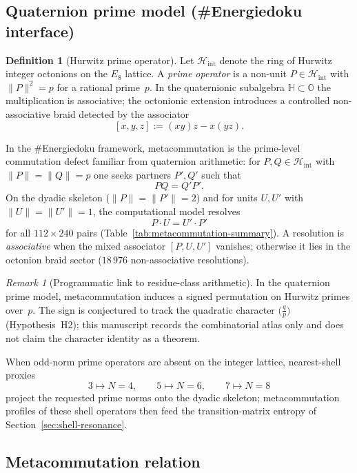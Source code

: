 \documentclass[11pt, lettersize, article]{article}
\theoremstyle{definition}
\newtheorem{definition}[theorem]{Definition}
\theoremstyle{remark}
\newtheorem{remark}[theorem]{Remark}
\begin{document}
\subsection{Quaternion prime model (\#Energiedoku interface)}

\begin{definition}[Hurwitz prime operator]
Let $\mathcal H_{\mathrm{int}}$ denote the ring of Hurwitz integer octonions on the $E_8$ lattice.
A \emph{prime operator} is a non-unit $P\in\mathcal H_{\mathrm{int}}$ with $\|P\|^2=p$ for a rational prime~$p$.
In the quaternionic subalgebra $\mathbb H\subset\mathbb O$ the multiplication is associative; the octonionic extension introduces a controlled non-associative braid detected by the associator
\[
  [x,y,z]:=(xy)z-x(yz).
\]
\end{definition}

In the \#Energiedoku framework, metacommutation is the prime-level commutation defect familiar from quaternion arithmetic:
for $P,Q\in\mathcal H_{\mathrm{int}}$ with $\|P\|=\|Q\|=p$ one seeks partners $P',Q'$ such that
\[
  PQ = Q'P'.
\]
On the dyadic skeleton ($\|P\|=\|P'\|=2$) and for units $U,U'$ with $\|U\|=\|U'\|=1$, the computational model resolves
\[
  P\cdot U = U'\cdot P'
\]
for all $112\times 240$ pairs (Table~\ref{tab:metacommutation-summary}).
A resolution is \emph{associative} when the mixed associator $[P,U,U']$ vanishes; otherwise it lies in the octonion braid sector ($18\,976$ non-associative resolutions).

\begin{remark}[Programmatic link to residue-class arithmetic]
In the quaternion prime model, metacommutation induces a signed permutation on Hurwitz primes over~$p$.
The sign is conjectured to track the quadratic character $\bigl(\frac{q}{p}\bigr)$ (Hypothesis~H2); this manuscript records the combinatorial atlas only and does not claim the character identity as a theorem.
\end{remark}

When odd-norm prime operators are absent on the integer lattice, nearest-shell proxies
\[
  3\mapsto N=4,\qquad 5\mapsto N=6,\qquad 7\mapsto N=8
\]
project the requested prime norms onto the dyadic skeleton; metacommutation profiles of these shell operators then feed the transition-matrix entropy of Section~\ref{sec:shell-resonance}.

\subsection{Metacommutation relation}
\end{document}
